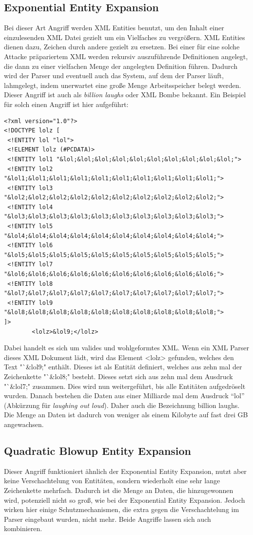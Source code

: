 		\subsection{Exponential Entity Expansion}
		Bei dieser Art Angriff werden XML Entities benutzt, um den Inhalt einer
		einzulesenden XML Datei gezielt um ein Vielfaches zu vergrößern. XML Entities
		dienen dazu, Zeichen durch andere gezielt zu ersetzen. Bei einer
		für eine solche Attacke präpariertem XML werden rekursiv auszuführende
		Definitionen angelegt, die dann zu einer vielfachen Menge der angelegten
		Definition führen. Dadurch wird der Parser und eventuell auch das System, auf
		dem der Parser läuft, lahmgelegt, indem unerwartet eine große Menge
		Arbeitsspeicher belegt werden. Dieser Angriff ist auch als \textit{billion laughs} oder XML
		Bombe bekannt.\cite{Sul09} Ein Beispiel für solch einen Angriff ist hier aufgeführt:
		\begin{lstlisting}
<?xml version="1.0"?>
<!DOCTYPE lolz [
 <!ENTITY lol "lol">
 <!ELEMENT lolz (#PCDATA)>
 <!ENTITY lol1 "&lol;&lol;&lol;&lol;&lol;&lol;&lol;&lol;&lol;&lol;">
 <!ENTITY lol2 "&lol1;&lol1;&lol1;&lol1;&lol1;&lol1;&lol1;&lol1;&lol1;&lol1;">
 <!ENTITY lol3 "&lol2;&lol2;&lol2;&lol2;&lol2;&lol2;&lol2;&lol2;&lol2;&lol2;">
 <!ENTITY lol4 "&lol3;&lol3;&lol3;&lol3;&lol3;&lol3;&lol3;&lol3;&lol3;&lol3;">
 <!ENTITY lol5 "&lol4;&lol4;&lol4;&lol4;&lol4;&lol4;&lol4;&lol4;&lol4;&lol4;">
 <!ENTITY lol6 "&lol5;&lol5;&lol5;&lol5;&lol5;&lol5;&lol5;&lol5;&lol5;&lol5;">
 <!ENTITY lol7 "&lol6;&lol6;&lol6;&lol6;&lol6;&lol6;&lol6;&lol6;&lol6;&lol6;">
 <!ENTITY lol8 "&lol7;&lol7;&lol7;&lol7;&lol7;&lol7;&lol7;&lol7;&lol7;&lol7;">
 <!ENTITY lol9 "&lol8;&lol8;&lol8;&lol8;&lol8;&lol8;&lol8;&lol8;&lol8;&lol8;">
]>
		<lolz>&lol9;</lolz>
		\end{lstlisting}
		Dabei handelt es sich um valides und wohlgeformtes XML. Wenn ein XML Parser
		dieses XML Dokument lädt, wird das Element <lolz> gefunden, welches den Text
		"`\&lol9;" enthält. Dieses ist als Entität definiert, welches aus zehn mal der
		Zeichenkette "`\&lol8;" besteht. Dieses setzt sich aus zehn mal
		dem Ausdruck "`\&lol7;"  zusammen. Dies wird nun weitergeführt, bis alle
		Entitäten aufgedröselt wurden. Danach bestehen die Daten aus einer Milliarde
		mal dem Ausdruck "`lol"' (Abkürzung für \textit{laughing out loud}). Daher
		auch die Bezeichnung billion laughs.
		Die Menge an Daten ist dadurch von weniger als einem Kilobyte auf fast drei GB
		angewachsen.\cite{Sul09}
		
		\subsection{Quadratic Blowup Entity Expansion}
		Dieser Angriff funktioniert ähnlich der Exponential Entity Expansion, nutzt
		aber keine Verschachtelung von Entitäten, sondern wiederholt eine sehr lange
		Zeichenkette mehrfach. Dadurch ist die Menge an Daten, die hinzugewonnen wird,
		potenziell nicht so groß, wie bei der Exponential Entity Expansion. Jedoch
		wirken hier einige Schutzmechanismen, die extra gegen die Verschachtelung im
		Parser eingebaut wurden, nicht mehr. Beide Angriffe lassen sich auch
		kombinieren.\cite{defusedxml}
		
